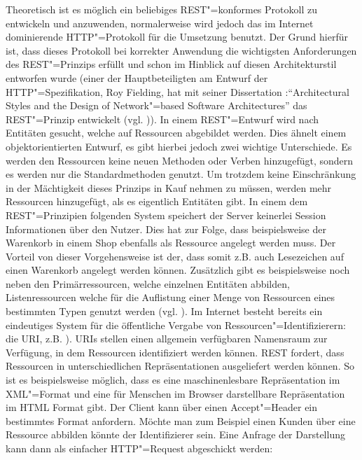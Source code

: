 Theoretisch ist es möglich ein beliebiges \ac{REST}"=konformes Protokoll zu entwickeln und anzuwenden, normalerweise wird jedoch das im Internet dominierende \ac{HTTP}"=Protokoll für die Umsetzung benutzt. Der Grund hierfür ist, dass dieses Protokoll bei korrekter Anwendung die wichtigsten Anforderungen des \ac{REST}"=Prinzips erfüllt und schon im Hinblick auf diesen Architekturstil entworfen wurde (einer der Hauptbeteiligten am Entwurf der \ac{HTTP}"=Spezifikation, Roy Fielding, hat mit seiner Dissertation :"`Architectural Styles and the Design of Network"=based Software Architectures"' das \ac{REST}"=Prinzip entwickelt (vgl. \cite{Fielding2000})). 
In einem \ac{REST}"=Entwurf wird nach Entitäten gesucht, welche auf Ressourcen abgebildet werden. Dies ähnelt einem objektorientierten Entwurf, es gibt hierbei jedoch zwei wichtige Unterschiede. Es werden den Ressourcen keine neuen Methoden oder Verben hinzugefügt, sondern es werden nur die Standardmethoden genutzt. Um trotzdem keine Einschränkung in der Mächtigkeit dieses Prinzips in Kauf nehmen zu müssen, werden mehr Ressourcen hinzugefügt, als es eigentlich Entitäten gibt. In einem dem \ac{REST}"=Prinzipien folgenden System speichert der Server keinerlei Session Informationen über den Nutzer. Dies hat zur Folge, dass beispielsweise der Warenkorb in einem Shop ebenfalls als Ressource angelegt werden muss. Der Vorteil von dieser Vorgehensweise ist der, dass somit z.B. auch Lesezeichen auf einen Warenkorb angelegt werden können. Zusätzlich gibt es beispielsweise noch neben den Primärressourcen, welche einzelnen Entitäten abbilden, Listenressourcen welche für die Auflistung einer Menge von Ressourcen eines bestimmten Typen genutzt werden (vgl. \cite{tilkovrest}). Im Internet besteht bereits ein eindeutiges System für die öffentliche Vergabe von Ressourcen"=Identifizierern: die \ac{URI}, z.B. ). URIs stellen einen allgemein verfügbaren Namensraum zur Verfügung, in dem Ressourcen identifiziert werden können. \ac{REST} fordert, dass Ressourcen in unterschiedlichen Repräsentationen ausgeliefert werden können. So ist es beispielsweise möglich, dass es eine maschinenlesbare Repräsentation im \ac{XML}"=Format und eine für Menschen im Browser darstellbare Repräsentation im \ac{HTML} Format gibt. Der Client kann über einen Accept"=Header ein bestimmtes Format anfordern.
Möchte man zum Beispiel einen Kunden über eine Ressource abbilden könnte der Identifizierer  sein. Eine Anfrage der Darstellung kann dann als einfacher \ac{HTTP}"=Request abgeschickt werden:
